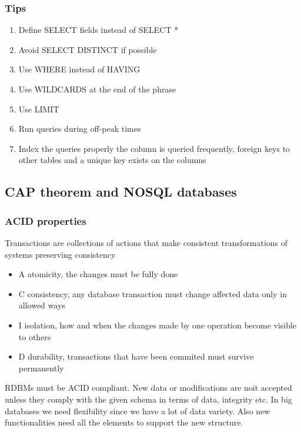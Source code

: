 \subsubsection{Tips}

\begin{enumerate}
    \item Define SELECT fields instead of SELECT *
    \item Avoid SELECT DISTINCT if possible
    \item Use WHERE instead of HAVING
    \item Use WILDCARDS at the end of the phrase
    \item Use LIMIT
    \item Run queries during off-peak times
    \item Index the queries properly \ra the column is queried frequently, foreign keys to other tables and a unique key exists on the columns
\end{enumerate}

\subsection{CAP theorem and NOSQL databases}

\subsubsection{ACID properties}

Transactions are collections of actions that make consistent transformations  of systems preserving consistency

\begin{itemize}
    \item A \ra atomicity, the changes must be fully done
    \item C \ra consistency, any database transaction must change affected data only in allowed ways
    \item I \ra isolation, how and when the changes made by one operation become visible to others
    \item D \ra durability, transactions that have been commited must survive permanently
\end{itemize}

RDBMs must be ACID compliant. New data or modifications are noit accepted unless they comply with the given schema in terms of data, integrity etc. In big databases we need flexibility since we have a lot of data variety. Also new functionalities need all the elements to support the new structure. 


